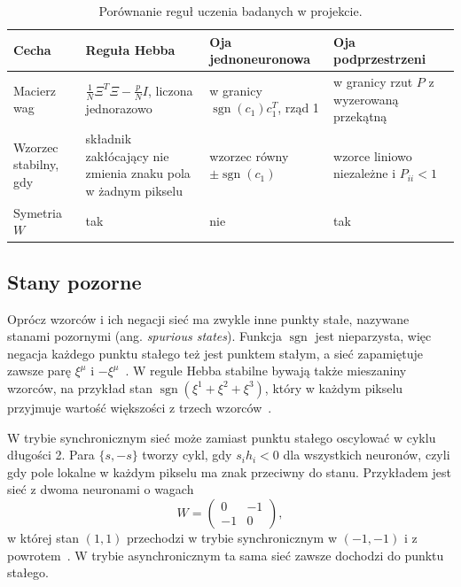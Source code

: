 \begin{table}[H]
    \centering
    \caption{Porównanie reguł uczenia badanych w projekcie.}
    \label{tab:porownanie-regul}
    \small
    \begin{tabularx}{\textwidth}{>{\raggedright\arraybackslash}p{2.6cm} >{\raggedright\arraybackslash}X >{\raggedright\arraybackslash}X >{\raggedright\arraybackslash}X}
        \toprule
        Cecha & Reguła Hebba & Oja jednoneuronowa & Oja podprzestrzeni \\
        \midrule
        Macierz wag & $\frac{1}{N} \Xi^T \Xi - \frac{p}{N} I$, liczona jednorazowo & w granicy $\operatorname{sgn}(c_1) c_1^T$, rząd 1 & w granicy rzut $P$ z wyzerowaną przekątną \\
        Wzorzec stabilny, gdy & składnik zakłócający nie zmienia znaku pola w żadnym pikselu & wzorzec równy $\pm \operatorname{sgn}(c_1)$ & wzorce liniowo niezależne i $P_{ii} < 1$ \\
        Symetria $W$ & tak & nie & tak \\
        \bottomrule
    \end{tabularx}
\end{table}

\subsection{Stany pozorne}
\label{sec:stany-pozorne}

Oprócz wzorców i ich negacji sieć ma zwykle inne punkty stałe, nazywane stanami pozornymi (ang. \textit{spurious states}). Funkcja $\operatorname{sgn}$ jest nieparzysta, więc negacja każdego punktu stałego też jest punktem stałym, a sieć zapamiętuje zawsze parę $\xi^\mu$ i $-\xi^\mu$~\cite[s.~510]{mackay2003}. W regule Hebba stabilne bywają także mieszaniny wzorców, na przykład stan $\operatorname{sgn}(\xi^1 + \xi^2 + \xi^3)$, który w każdym pikselu przyjmuje wartość większości z trzech wzorców~\cite{hopfield1983}.

W trybie synchronicznym sieć może zamiast punktu stałego oscylować w cyklu długości 2. Para $\{s, -s\}$ tworzy cykl, gdy $s_i h_i < 0$ dla wszystkich neuronów, czyli gdy pole lokalne w każdym pikselu ma znak przeciwny do stanu.
Przykładem jest sieć z dwoma neuronami o wagach
\[
    W = \begin{pmatrix} 0 & -1 \\ -1 & 0 \end{pmatrix},
\]
w której stan $(1, 1)$ przechodzi w trybie synchronicznym w $(-1, -1)$ i z powrotem~\cite[s.~1580]{bruck1990}. W trybie asynchronicznym ta sama sieć zawsze dochodzi do punktu stałego.
